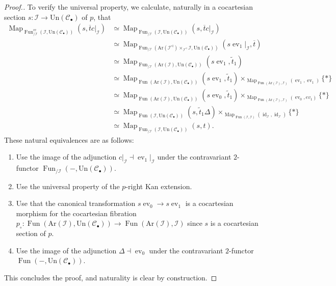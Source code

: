 \documentclass[a4paper,reqno,10pt]{amsart}
\theoremstyle{definition}
\theoremstyle{remark}
\newcommand{\C}{\mathcal{C}}
\newcommand{\I}{\mathcal{I}}
\newcommand{\Map}{\operatorname{Map}}
\newcommand{\id}{\operatorname{id}}
\newcommand{\ev}{\operatorname{ev}}
\newcommand{\Fun}{\operatorname{Fun}}
\newcommand{\Un}{\mathrm{Un}}
\newcommand{\Ar}{\mathrm{Ar}}
\newcommand{\cc}{\mathrm{cc}}
\begin{document}
\begin{proof}[Proof.]
To verify the universal property, we calculate, naturally in a cocartesian section $s\colon\I\rightarrow\Un(\C_{\bullet})$ of $p$, that
\begin{align}
\Map_{\Fun_{/\I}^{\cc}(\I,\Un(\C_{\bullet}))}(s,\overline{t}c\vert_{\I})&\simeq\Map_{\Fun_{/\I}(\I,\Un(\C_{\bullet}))}(s,\overline{t}c\vert_{\I})\nonumber\\
&\simeq\Map_{\Fun_{/\I}(\Ar(\I^{\triangleleft})\times_{\I^{\triangleleft}}\I,\Un(\C_{\bullet}))}(s\ev_1\vert_{\I},\overline{t})\\
&\simeq\Map_{\Fun_{/\I}(\Ar(\I),\Un(\C_{\bullet}))}(s\ev_1,\tilde{t}_1)\\
&\simeq\Map_{\Fun(\Ar(\I),\Un(\C_{\bullet}))}(s\ev_1,\tilde{t}_1)\times_{\Map_{\Fun(\Ar(\I),\I)}(\ev_1,\ev_1)}\{\ast\}\nonumber\\
&\simeq\Map_{\Fun(\Ar(\I),\Un(\C_{\bullet}))}(s\ev_0,\tilde{t}_1)\times_{\Map_{\Fun(\Ar(\I),\I)}(\ev_0,ev_1)}\{\ast\}\\
&\simeq\Map_{\Fun(\I,\Un(\C_{\bullet}))}(s,\tilde{t}_1\Delta)\times_{\Map_{\Fun(\I,\I)}(\id_{\I},\id_{\I})}\{\ast\}\\
&\simeq\Map_{\Fun_{/\I}(\I,\Un(\C_{\bullet}))}(s,t).\nonumber
\end{align}
These natural equivalences are as follows:
\begin{enumerate}[label=(\arabic*)]
\item Use the image of the adjunction $c\vert_{\I}\dashv\ev_1\vert_{\I}$ under the contravariant $2$-functor $\Fun_{/\I}(-,\Un(\C_{\bullet}))$.
\item Use the universal property of the $p$-right Kan extension.
\item Use that the canonical transformation $s\ev_0\rightarrow s\ev_1$ is a cocartesian morphism for the cocartesian fibration $p_{\circ}\colon\Fun(\Ar(\I),\Un(\C_{\bullet}))\rightarrow\Fun(\Ar(\I),\I)$ since $s$ is a cocartesian section of $p$.
\item Use the image of the adjunction $\Delta\dashv\ev_0$ under the contravariant $2$-functor $\Fun(-,\Un(\C_{\bullet}))$.
\end{enumerate}
This concludes the proof, and naturality is clear by construction.
\end{proof}
\end{document}
